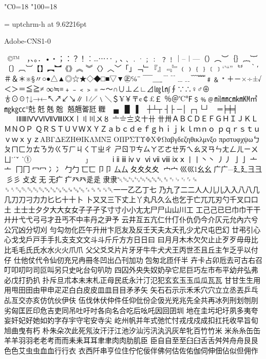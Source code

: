 %
%
%
%
\kcatcode"C0=18%
\kcatcode"100=18%

\font\uptchrm = uptchrm-h at 9.62216pt
\uptchrm


Adobe-CNS1-0

 ©™　，、。．•‧；：？！︰…⋯‥﹐､﹑﹒·﹔﹕
﹖﹗｜–︱—（）︵︶｛｝︷︸〔〕︹︺【】︻︼《》︽
︾〈〉︿﹀「」﹁﹂『』﹃﹄﹙﹚﹛﹜﹝﹞‘’“”〝〞
‵′＃＆＊※§〃○●△▲◎☆★◇◆□■▽▼㊣℅¯̄
‾￣＿ˍ﹉﹊﹍﹎﹋﹌﹟﹠﹡＋－×÷±√＜＞＝≦≧≠
∞≒≡﹢﹣﹤﹥﹦∼～∩∪⊥∠∟⊿㏒㏑∫∮∵∴♀♂⊕
♁⊙☉↑↓→←↖↗↙↘∥∣∕／﹨＼＄¥￥〒¢￠£￡
％＠℃℉﹩﹪﹫㏕㎜㎝㎞㏎㎡㎎㎏㏄°兙兛兞兝
兡兣嗧瓩糎▁▂▃▄▅▆▇█▏▎▍▌▋▊▉┼┴┬
┤├▔─│▕┌┐└┘╭╮╰╯═╞╪╡◢◣◥◤╱╲╳
０１２３４５６７８９ⅠⅡⅢⅣⅤⅥⅦⅧⅨⅩ〡〢〣〤〥
〦〧〨〩〸卄〹〺ＡＢＣＤＥＦＧＨＩＪＫＬＭＮＯＰ
ＱＲＳＴＵＶＷＸＹＺａｂｃｄｅｆｇｈｉｊｋｌｍｎｏ
ｐｑｒｓｔｕｖｗｘｙｚΑΒΓΔΕΖΗΘΙΚΛΜΝΞ
ΟΠΡΣΤΥΦΧΨΩαβγδεζηθικλμνξο
πρστυφχψωㄅㄆㄇㄈㄉㄊㄋㄌㄍㄎㄏㄐㄑㄒㄓㄔ
ㄕㄖㄗㄘㄙㄚㄛㄜㄝㄞㄟㄠㄡㄢㄣㄤㄥㄦㄧㄨㄩ˙ˊˇ̌
ˋ①②③④⑤⑥⑦⑧⑨⑩⑴⑵
⑶⑷⑸⑹⑺⑻⑼⑽ⅰⅱⅲⅳⅴ
ⅵⅶⅷⅸⅹ丨⼁丶⼂丿⼃⼅亅⼇亠
冂⼌冖⼍冫⼎⼓勹⼖匸⼙卩⼛厶⼡⼢夂夊
⼧宀⼮巛幺⼳广⼴廴⼵彐⼹彡⼺⽁攴⽆
无疒⽧癶⽨⾡辵⾪隶␀␁␂␃␄␅␆␇␈␉␊␋␌␍
␎␏␐␑␒␓␔␕␖␗␘␙␚␛␜␝␞␟␡⼀一⼄乙丁七
乃九了⼆二人⼈儿⼉入⼊八⼋⼏几⼑刀刁⼒力⼔匕十⼗卜
⼘⼜又三下丈上丫丸凡久么也乞于亡兀兀刃勺千叉⼝口土
⼟士⼠夕⼣大⼤女⼥⼦子孑孓寸⼨小⼩尢⼪尸⼫⼭山川工
⼯⼰己已巳巾⼱干⼲廾⼶弋⼷弓⼸才丑丐不中丰丹之尹予
云井互五亢仁什仃仆仇仍今介仄元允內六兮公冗凶分切刈
勻勾勿化匹午升卅卞厄友及反壬天夫太夭孔少尤尺屯巴幻
廿弔引心⼼戈⼽戶⼾手⼿扎⽀支文⽂斗⽃斤⽄方⽅日⽇曰
⽈月⽉木⽊欠⽋止⽌歹⽍毋⽏比⽐毛⽑氏⽒水⽔火⽕爪⽖
父⽗爻⽘片⽚牙⽛牛⽜犬⽝王丙世丕且丘主乍乏乎以付仔
仕他仗代令仙仞充兄冉冊冬凹出凸刊加功包匆北匝仟半
卉卡占卯卮去可古右召叮叩叨叼司叵叫另只史叱台句叭叻
四囚外央失奴奶孕它尼巨巧左市布平幼弁弘弗必戊打扔扒
扑斥旦朮本未末札正母民氐永汁汀氾犯玄⽞玉⽟瓜⽠瓦⽡
甘⽢生⽣⽤用甩⽥田由甲申⽦疋白⽩皮⽪皿⽫目⽬矛⽭矢
⽮石⽯示⽰禾⽲穴⽳立⽴丞丟乒乓乩亙交亦亥仿伉伙伊伕
伍伐休伏仲件任仰仳份企伋光兇兆先全共再冰列刑划刎刖
劣匈匡匠印危吉吏同吊吐吁吋各向名合吃后吆吒因回囝圳
地在圭圬圯圩夙多夷夸妄奸妃好她如妁字存宇守宅安寺尖
屹州帆并年式弛忙忖戎戌戍成扣扛托收早旨旬旭曲曳有朽
朴朱朵次此死氖汝汗汙江池汐汕污汛汍汎灰牟牝百竹⽵米
⽶糸⽷缶⽸羊⽺羽⽻老⽼考而⽽耒⽾耳⽿聿⾀肉⾁肋肌臣
⾂自⾃至⾄臼⾅舌⾆舛⾇舟⾈艮⾉色⾊艾虫⾍血⾎行⾏衣
⾐西阡串亨位住佇佗佞伴佛何估佐佑伽伺伸佃佔似但佣作
